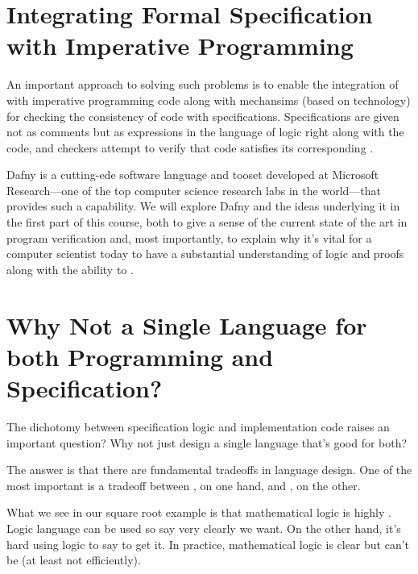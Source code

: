\documentclass[letterpaper,10pt,english]{sphinxmanual}
\begin{document}
\section{Integrating Formal Specification with Imperative Programming}
\label{\detokenize{02-logic-and-code:integrating-formal-specification-with-imperative-programming}}
An important approach to solving such problems is to enable the
integration of  with imperative programming
code along with mechansims (based on  technology) for
checking the consistency of code with specifications. Specifications
are given not as comments but as expressions in the language of logic
right along with the code, and checkers attempt to verify that code
satisfies its corresponding .

Dafny is a cutting-ede software language and tooset developed at
Microsoft Research—one of the top computer science research labs in
the world—that provides such a capability. We will explore Dafny and
the ideas underlying it in the first part of this course, both to give
a sense of the current state of the art in program verification and,
most importantly, to explain why it’s vital for a computer scientist
today to have a substantial understanding of logic and proofs along
with the ability to .


\section{Why Not a Single Language for both Programming and Specification?}
\label{\detokenize{02-logic-and-code:why-not-a-single-language-for-both-programming-and-specification}}
The dichotomy between specification logic and implementation code
raises an important question? Why not just design a single language
that’s good for both?

The answer is that there are fundamental tradeoffs in language design.
One of the most important is a tradeoff between , on
one hand, and , on the other.

What we see in our square root example is that mathematical logic is
highly . Logic language can be used so say very clearly
 we want. On the other hand, it’s hard using logic to say 
to get it. In practice, mathematical logic is clear but can’t be 
(at least not efficiently).
\end{document}

